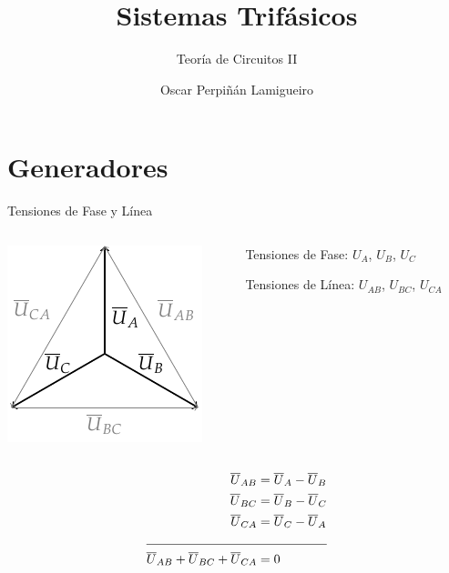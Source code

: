 \documentclass[aspectratio=169, usenames,svgnames,dvipsnames]{beamer}
\author{Oscar Perpiñán Lamigueiro}
\date{}
\title{Sistemas Trifásicos}
\subtitle{Teoría de Circuitos II}
\begin{document}
\maketitle

\section{Generadores}
\label{sec:org8ca81fd}
\begin{frame}[label={sec:orgb71646f}]{Tensiones de Fase y Línea}
\begin{columns}
\begin{column}{0.4\columnwidth}
\begin{center}
\includegraphics[height=0.4\textheight]{../figs/FasoresTrifasica_ABC.pdf}
\end{center}
\end{column}

\begin{column}{0.6\columnwidth}
Tensiones de \alert{Fase}: \(U_A\), \(U_B\), \(U_C\)

Tensiones de \alert{Línea}: \(U_{AB}\), \(U_{BC}\), \(U_{CA}\)
\end{column}
\end{columns}

     \begin{align*}
       \overline{U}_{AB} &= \overline{U}_A - \overline{U}_B\\
       \overline{U}_{BC} &= \overline{U}_B - \overline{U}_C\\
       \overline{U}_{CA} &= \overline{U}_C - \overline{U}_A\\
\cline{1-2}
       \overline{U}_{AB} + \overline{U}_{BC} + \overline{U}_{CA} &= 0     \end{align*}
\end{frame}
\end{document}
